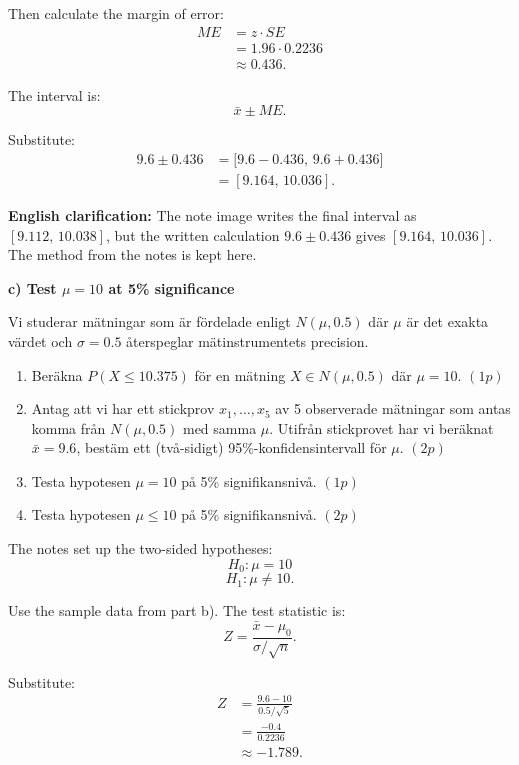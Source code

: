 \documentclass[10pt]{article}
\begin{document}
Then calculate the margin of error:
\begin{align*}
ME
&=
z\cdot SE
\\[2mm]
&=
1.96\cdot 0.2236
\\[2mm]
&\approx 0.436.
\end{align*}

The interval is:
\[
\bar{x}\pm ME.
\]

Substitute:
\begin{align*}
9.6 \pm 0.436
&=
\bigl[
9.6-0.436,\,
9.6+0.436
\bigr]
\\[2mm]
&=
[9.164,\,10.036].
\end{align*}

\textbf{English clarification:}
The note image writes the final interval as
\([9.112,\,10.038]\), but the written calculation
\(9.6\pm 0.436\) gives \([9.164,\,10.036]\).
The method from the notes is kept here.

\textbf{c) Test \(\mu=10\) at 5\% significance}

Vi studerar mätningar som är fördelade enligt
\(N(\mu,0.5)\) där \(\mu\) är det exakta värdet
och \(\sigma = 0.5\) återspeglar mätinstrumentets
precision.

\begin{enumerate}[label=\alph*)]
\item Beräkna \(P(X \le 10.375)\) för en mätning
\(X \in N(\mu,0.5)\) där \(\mu = 10\). \((1p)\)

\item Antag att vi har ett stickprov
\(x_1,\ldots,x_5\) av 5 observerade mätningar som
antas komma från \(N(\mu,0.5)\) med samma \(\mu\).
Utifrån stickprovet har vi beräknat \(\bar{x}=9.6\),
bestäm ett (två-sidigt) 95\%-konfidensintervall
för \(\mu\). \((2p)\)

\item Testa hypotesen \(\mu = 10\) på
5\% signifikansnivå. \((1p)\)

\item Testa hypotesen \(\mu \le 10\) på
5\% signifikansnivå. \((2p)\)
\end{enumerate}

The notes set up the two-sided hypotheses:
\[
H_0:\mu=10
\]
\[
H_1:\mu\ne 10.
\]

Use the sample data from part b).
The test statistic is:
\[
Z=
\frac{\bar{x}-\mu_0}{\sigma/\sqrt{n}}.
\]

Substitute:
\begin{align*}
Z
&=
\frac{9.6-10}{0.5/\sqrt{5}}
\\[2mm]
&=
\frac{-0.4}{0.2236}
\\[2mm]
&\approx -1.789.
\end{align*}
\end{document}
